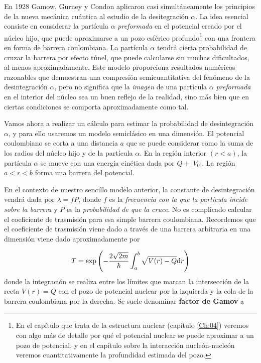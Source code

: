En 1928 Gamow, Gurney y Condon aplicaron casi simultáneamente los principios de la nueva mecánica cuántica al estudio de la desitegración $\alpha$. La idea esencial consiste en considerar la partícula $\alpha$ \textit{preformada} en el potencial creado por el núcleo hijo, que puede aproximarse a un pozo esférico profundo\footnote{En el capítulo que trata de la estructura nuclear (capítulo \ref{Ch:04}) veremos con algo más de detalle por qué el potencial nuclear se puede aproximar a un pozo de potencial, y en el capítulo sobre la interacción nucleón-nucleón veremos cuantitativamente la profundidad estimada del pozo.} con una frontera en forma de barrera coulombiana. La partícula $\alpha$ tendrá cierta probabilidad de cruzar la barrera por efecto túnel, que puede calcularse sin muchas dificultados, al menos aproximadamente. Este modelo proporciona resultados numéricos razonables que demuestran una compresión semicuantitativa del fenómeno de la desintegración $\alpha$, pero no significa que la \textit{imagen} de una partícula $\alpha$ \textit{preformada} en el interior del núcleo sea un buen reflejo de la realidad, sino más bien que en ciertas condiciones se comporta aproximadamente como tal.

Vamos ahora a realizar un cálculo para estimar la probabilidad de desintegración $\alpha$, y para ello usaremos un modelo semiclásico en una dimensión. El potencial coulombiano se corta a una distancia $a$ que se puede considerar como la suma de los radios del núcleo hijo y de la partícula $\alpha$. En la región interior $(r<a)$, la partícula $\alpha$ se mueve con una energía cinética dada por $Q+|V_0|$. La región $a<r<b$ forma una barrera del potencial. 

En el contexto de nuestro sencillo modelo anterior, la constante de desintegración vendrá dada por $\lambda = fP$, donde $f$ es la \textit{frecuencia con la que la partícula incide sobre la barrera} y $P$ es la \textit{probabilidad de que la cruce}. No es complicado calcular el coeficiente de trasmisión para esa simple barrera coulombiana. Recordemos que el coeficiente de trasmisión viene dado a través de una barrera arbitraria en una dimensión viene dado aproximadamente por

\begin{equation}
    T = \exp \left( -\frac{2\sqrt{2m}}{\hbar } \int_a^b \sqrt{V(r)-Q}\mathrm{d} r \right)
\end{equation}
donde la integración se realiza entre los límites que marcan la intersección de la recta $V(r) = Q$ con el pozo de potencial nuclear por la izquierda y la cola de la barrera coulombiana por la derecha. Se suele denominar \textbf{factor de Gamov} a 

